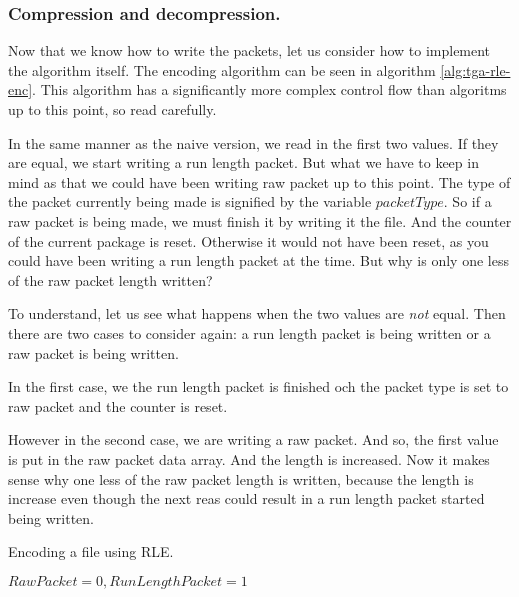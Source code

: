 \begin{refsection}
\subsubsection{Compression and decompression.}
\label{sec:compr-decompr}

Now that we know how to write the packets, let us consider how to
implement the algorithm itself. The encoding algorithm can be seen in
algorithm \ref{alg:tga-rle-enc}. This algorithm has a significantly
more complex control flow than algoritms up to this point, so read
carefully.

In the same manner as the naive version, we read in the first two
values. If they are equal, we start writing a run length packet. But
what we have to keep in mind as that we could have been writing raw
packet up to this point. The type of the packet currently being made
is signified by the variable $packetType$. So if a raw packet is being
made, we must finish it by writing it the file. And the counter of the
current package is reset. Otherwise it would not have been reset, as
you could have been writing a run length packet at the time. But why
is only one less of the raw packet length written?

To understand, let us see what happens when the two values are
\textit{not} equal. Then there are two cases to consider again: a run
length packet is being written or a raw packet is being written.

In the first case, we the run length packet is finished och the packet
type is set to raw packet and the counter is reset.

However in the second case, we are writing a raw packet. And so, the
first value is put in the raw packet data array. And the length is
increased. Now it makes sense why one less of the raw packet length is
written, because the length is increase even though the next reas
could result in a run length packet started being written.

\begin{algorithm}[h]
  \caption{Encoding a file using RLE.}
  \label{alg:tga-rle-enc}
  \begin{algorithmic}[1]
    \Require $RawPacket = 0,RunLengthPacket = 1$


    \While{\neof}



\end{algorithmic}
\end{algorithm}
\end{refsection}
